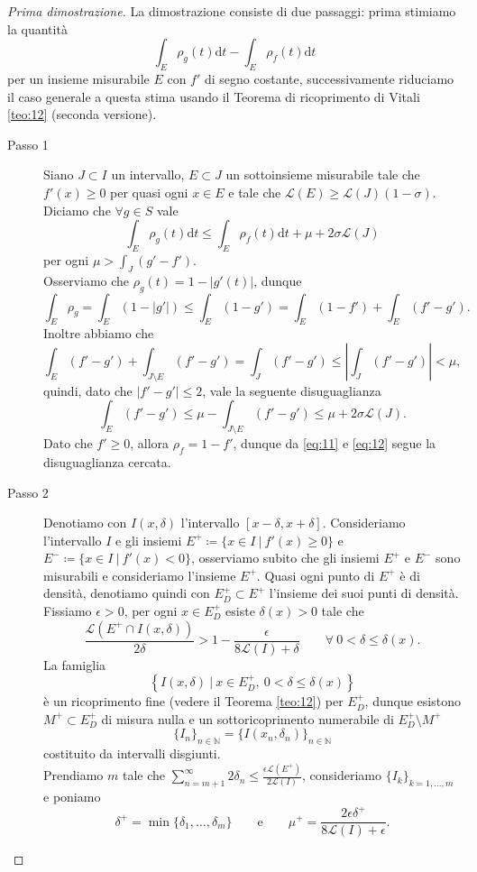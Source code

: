\documentclass[a4paper,11pt]{book}
\theoremstyle{plain}
\theoremstyle{definition}
\theoremstyle{remark}
\newcommand{\N}{\mathbb{N}}
\newcommand{\LL}{\mathscr{L}}
\newcommand{\diff}{\text{d}}
\begin{document}
\begin{proof}[Prima dimostrazione]
	La dimostrazione consiste di due passaggi: prima stimiamo la quantità
	\[
		\int_E\rho_g(t)\diff t-\int_E\rho_f(t)\diff t
	\]
	per un insieme misurabile $E$ con $f'$ di segno costante, successivamente riduciamo il caso generale a questa stima usando il Teorema di ricoprimento di Vitali \ref{teo:12} (seconda versione).
	\begin{description}
		\item [Passo 1] Siano $J\subset I$ un intervallo, $E\subset J$ un sottoinsieme misurabile tale che $f'(x)\geq 0$ per quasi ogni $x\in E$ e tale che $\LL(E)\geq \LL(J)(1-\sigma)$. Diciamo che $\forall g\in S$ vale
		\begin{equation}\label{eq:13}
			\int_E\rho_g(t)\diff t\leq \int_E\rho_f(t)\diff t+\mu+2\sigma\LL(J)
		\end{equation}
		per ogni $\displaystyle\mu>\int_{J}(g'-f')$.\\
		Osserviamo che $\rho_g(t) = 1-|g'(t)|$, dunque
		\begin{equation}\label{eq:11}
			\int_E\rho_g = \int_E (1-|g'|)\leq \int_E (1-g') = \int_E(1-f')+\int_E(f'-g').
		\end{equation}
		Inoltre abbiamo che
		\[
			\int_E(f'-g')+\int_{J\setminus E}(f'-g')=\int_J(f'-g')\leq \left|\int_J(f'-g')\right| <\mu,
		\]
		quindi, dato che $|f'-g'|\leq 2$, vale la seguente disuguaglianza
		\begin{equation}\label{eq:12}
			\int_E(f'-g')\leq \mu-\int_{J\setminus E}(f'-g')\leq \mu+2\sigma\LL(J).
		\end{equation}
		Dato che $f'\geq 0$, allora $\rho_f=1-f'$, dunque da \eqref{eq:11} e \eqref{eq:12} segue la disuguaglianza cercata.
		\item [Passo 2] Denotiamo con $I(x,\delta)$ l'intervallo $[x-\delta,x+\delta]$. Consideriamo l'intervallo $I$ e gli insiemi $E^+\coloneqq \{x\in I\ |\ f'(x)\geq 0\}$ e $E^-\coloneqq \{x\in I\ |\ f'(x)<0\}$, osserviamo subito che gli insiemi $E^+$ e $E^-$ sono misurabili e consideriamo l'insieme $E^+$. Quasi ogni punto di $E^+$ è di densità, denotiamo quindi con $E^+_D\subset E^+$ l'insieme dei suoi punti di densità. Fissiamo $\epsilon>0$, per ogni $x\in E^+_D$ esiste $\delta(x)>0$ tale che
		\[
			\frac{\LL(E^+\cap I(x,\delta))}{2\delta} > 1-\frac{\epsilon}{8\LL(I)+\delta}\qquad \forall\ 0<\delta\leq \delta(x).
		\]
		La famiglia
		\[
			\left\{I(x,\delta)\ |\ x\in E_D^+,\ 0<\delta\leq \delta(x)\right\}
		\]
		è un ricoprimento fine (vedere il Teorema \ref{teo:12}) per $E^+_D$, dunque esistono $M^+\subset E^+_D$ di misura nulla e un sottoricoprimento numerabile di $E^+_D\setminus M^+$
		\[
			\{I_n\}_{n\in \N}=\{I(x_n,\delta_n)\}_{n\in \N}
		\]
		costituito da intervalli disgiunti.\\
		Prendiamo $m$ tale che $\displaystyle\sum_{n=m+1}^{\infty}2\delta_n\leq \frac{\epsilon\LL(E^+)}{2\LL(I)}$, consideriamo $\{I_k\}_{k=1,\ldots,m}$ e poniamo
		\[
			\delta^+=\min\{\delta_1,\ldots,\delta_m\}\qquad \text{e}\qquad \mu^+=\frac{2\epsilon\delta^+}{8\LL(I)+\epsilon}.
		\]
		

\end{description}
\end{proof}
\end{document}
